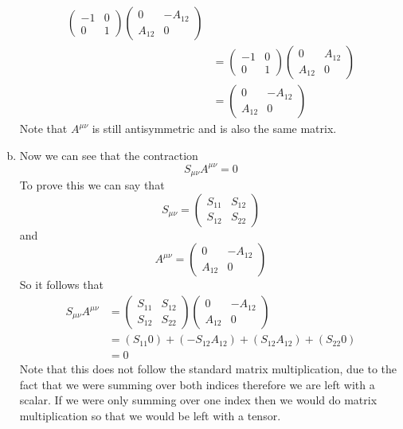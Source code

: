 \documentclass[11pt]{article}
\numberwithin{equation}{section}
\begin{document}
\begin{enumerate}[(a)]
\begin{align*}
	\left(\begin{array}{cccc}
		-1 &0\\
		0 &1 
	\end{array}\right)
	\left(\begin{array}{cc}
		0 	&-A_{12}\\
		A_{12} 	&0
	\end{array}\right)\\
&=	\left(\begin{array}{cc}
		-1 &0\\
		0 &1 
	\end{array}\right)
	\left(\begin{array}{cc}
		0 &A_{12}\\
		A_{12} &0 
	\end{array}\right)\\
&=	\left(\begin{array}{cc}
		0 &-A_{12}\\
		A_{12} &0 
	\end{array}\right)
\end{align*}
Note that $A^{\mu\nu}$ is still antisymmetric and is also the same matrix.

\item
Now we can see that the contraction
$$S_{\mu\nu}A^{\mu\nu} = 0$$
To prove this we can say that
$$S_{\mu\nu} = \left(\begin{array}{cc}
		S_{11} 	&S_{12}\\
		S_{12} 	&S_{22}
		\end{array}\right)$$
and
$$A^{\mu\nu} = \left(\begin{array}{cc}
		0 	&-A_{12}\\
		A_{12} 	&0
		\end{array}\right)$$
So it follows that
\begin{align*}
S_{\mu\nu}A^{\mu\nu} &= \left(\begin{array}{cc}
		S_{11} 	&S_{12}\\
		S_{12} 	&S_{22}
		\end{array}\right)
		\left(\begin{array}{cc}
		0 	&-A_{12}\\
		A_{12} 	&0
		\end{array}\right)\\
&= (S_{11}0) + (-S_{12}A_{12}) + (S_{12}A_{12}) + (S_{22}0)\\
&=0
\end{align*}
Note that this does not follow the standard matrix multiplication, due to the fact that we were summing over both indices therefore we are left with a scalar. If we were only summing over one index then we would do matrix multiplication so that we would be left with a tensor.
\end{enumerate}
\end{document}
